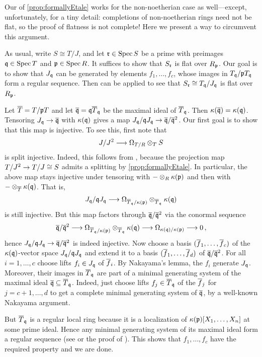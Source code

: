 \documentclass[a4paper, 10pt, oneside, DIV=9, chapterprefix=true, numbers=enddot, bibliography=totoc]{scrbook}
\begin{document}
\begin{rem*}
	Our  of \cref{prop:formallyEtale} works for the non-noetherian case as well---except, unfortunately, for a tiny detail: completions of non-noetherian rings need not be flat, so the proof of flatness is not complete! Here we present a way to circumvent this argument.
	
	As usual, write $S\cong T/J$, and let $\mathfrak{r}\in \operatorname{Spec} S$ be a prime with preimages $\mathfrak{q}\in \operatorname{Spec} T$ and $\mathfrak{p}\in \operatorname{Spec} R$. It suffices to show that $S_{\mathfrak{r}}$ is flat over $R_{\mathfrak{p}}$. Our goal is to show that $J_{\mathfrak{q}}$ can be generated by elements $f_1,\dotsc,f_c$, whose images in $T_{\mathfrak{q}}/\mathfrak{p} T_{\mathfrak{q}}$ form a regular sequence. Then \cite[]{stacks-project} can be applied to see that $S_{\mathfrak{r}}\cong T_{\mathfrak{q}}/J_{\mathfrak{q}}$ is flat over $R_{\mathfrak{p}}$.
	
	Let $\ov{T}=T/\pp T$ and let $\ov{\qq}=\qq\ov{T}_\qq$ be the maximal ideal of $\ov{T}_\qq$. Then $\kappa(\ov{\qq})=\kappa(\qq)$. Tensoring $J_\qq\morphism \ov{\qq}$ with $\kappa(\mathfrak{q})$ gives a map $J_\qq/\qq J_\qq\morphism\ov{\qq}/\ov{\qq}^2$. Our first goal is to show that this map is injective. To see this, first note that
	\begin{equation*}
		J/J^2\morphism\Omega_{T/R}\otimes_TS
	\end{equation*}
	is split injective. Indeed, this follows from \cite[Proposition~16.12]{eisenbudCommAlg}, because the projection map $T/J^2\morphism T/J\cong S$ admits a splitting by \cref{prop:formallyEtale}. In particular, the above map stays injective under tensoring with $-\otimes_R\kappa(\mathfrak{p})$ and then with $-\otimes_{\ov{T}}\kappa(\qq)$. That is,
	\begin{equation*}
		J_\qq/\qq J_\qq\morphism\Omega_{\ov{T}_\qq/\kappa(\pp)}\otimes_{\ov{T}_\qq}\kappa(\qq)
	\end{equation*}
	is still injective. But this map factors through $\ov{\qq}/\ov{\qq}^2$ via the conormal sequence
	\begin{equation*}
		\ov{\qq}/\ov{\qq}^2\morphism\Omega_{\ov{T}_\qq/\kappa(\pp)}\otimes_{\ov{T}_\qq}\kappa(\qq)\morphism\Omega_{\kappa(\qq)/\kappa(\pp)}\morphism 0\,,
	\end{equation*}
	hence $J_\qq/\qq J_\qq\morphism \ov{\qq}/\ov{\qq}^2$ is indeed injective. Now choose a basis $(\ov{f}_1,\dotsc,\ov{f}_c)$ of the $\kappa(\mathfrak{q})$-vector space $J_{\mathfrak{q}}/\mathfrak{q} J_{\mathfrak{q}}$ and extend it to a basis $(\ov{f}_1,\dotsc,\ov{f}_d)$ of $\ov{\qq}/\ov{\qq}^2$. For all $i=1,\dotsc,c$ choose lifts $f_i\in J_{\mathfrak{q}}$ of $\ov{f}_i$. By Nakayama's lemma, the $f_i$ generate $J_{\mathfrak{q}}$. Moreover, their images in $\ov{T}_\qq$ are part of a minimal generating system of the maximal ideal $\ov{\qq}\subseteq \ov{T}_\qq$. Indeed, just choose lifts $f_j\in \ov{T}_\qq$ of the $\ov{f}_j$ for $j=c+1,\dotsc,d$ to get a complete minimal generating system of $\ov{\qq}$, by a well-known Nakayama argument.
	
	But $\ov{T}_\qq$ is a regular local ring because it is a localization of $\kappa(\mathfrak{p})[X_1,\dotsc,X_n]$ at some prime ideal. Hence any minimal generating system of its maximal ideal form a regular sequence (see \cite[]{stacks-project} or the proof of \cite[Proposition~2.2.1]{homalg}). This shows that $f_1,\dotsc,f_c$ have the required property and we are done.
\end{rem*}
\end{document}
